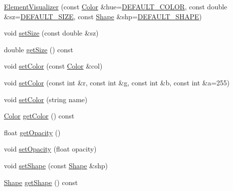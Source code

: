 \begin{DoxyCompactItemize}
\item 
\hyperlink{classbridges_1_1_element_visualizer_af792c8b0aaa76d07f5806df83f27ccb6}{Element\+Visualizer} (const \hyperlink{classbridges_1_1_color}{Color} \&hue=\hyperlink{classbridges_1_1_element_visualizer_ade224640b18e3f6eed42098ea0ad5b3a}{D\+E\+F\+A\+U\+L\+T\+\_\+\+C\+O\+L\+O\+R}, const double \&sz=\hyperlink{classbridges_1_1_element_visualizer_a81cc788d6149d5d582099cbc35e18c5a}{D\+E\+F\+A\+U\+L\+T\+\_\+\+S\+I\+Z\+E}, const \hyperlink{namespacebridges_a1b4050586bd708782ae0d4f3b06b9579}{Shape} \&shp=\hyperlink{classbridges_1_1_element_visualizer_a2800a212357180e4941a818b958aabd9}{D\+E\+F\+A\+U\+L\+T\+\_\+\+S\+H\+A\+P\+E})
\item 
void \hyperlink{classbridges_1_1_element_visualizer_a6fc924e754008992b310a89d8d88fce9}{set\+Size} (const double \&sz)
\item 
double \hyperlink{classbridges_1_1_element_visualizer_aae6ce4807e470d0bda96cf6753e81669}{get\+Size} () const 
\item 
void \hyperlink{classbridges_1_1_element_visualizer_af14723066e52c159eebfb804d65dd825}{set\+Color} (const \hyperlink{classbridges_1_1_color}{Color} \&col)
\item 
void \hyperlink{classbridges_1_1_element_visualizer_a9f373aedd41dc834177b39cffac4e9ef}{set\+Color} (const int \&r, const int \&g, const int \&b, const int \&a=255)
\item 
void \hyperlink{classbridges_1_1_element_visualizer_ab17fb1224368f03ee4eba7e1d5d6cef8}{set\+Color} (string name)
\item 
\hyperlink{classbridges_1_1_color}{Color} \hyperlink{classbridges_1_1_element_visualizer_a93012c4fb2d8a67128b5c83cc8e5c190}{get\+Color} () const 
\item 
float \hyperlink{classbridges_1_1_element_visualizer_ac9fbf528a593bb9de96838983ea05d7b}{get\+Opacity} ()
\item 
void \hyperlink{classbridges_1_1_element_visualizer_ac9e6ee91ae6c72393ed7f46521933497}{set\+Opacity} (float opacity)
\item 
void \hyperlink{classbridges_1_1_element_visualizer_af81cc20423f2fedffa81fb7c473a1179}{set\+Shape} (const \hyperlink{namespacebridges_a1b4050586bd708782ae0d4f3b06b9579}{Shape} \&shp)
\item 
\hyperlink{namespacebridges_a1b4050586bd708782ae0d4f3b06b9579}{Shape} \hyperlink{classbridges_1_1_element_visualizer_a3e1bb5ba7ae2e5a23fbb75c7b09d350c}{get\+Shape} () const 
\end{DoxyCompactItemize}
